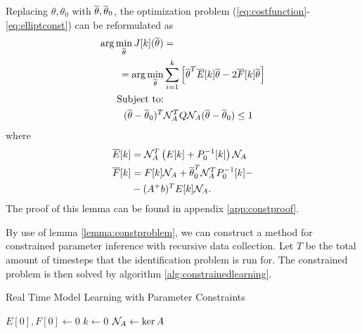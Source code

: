 \begin{lemma}
Replacing $\theta, \theta_0$ with $\overline{\theta}, \overline{\theta}_0$, the optimization problem
(\ref{eq:costfunction}-\ref{eq:elliptconst}) can be reformulated as
\begin{align}
    \arg\min\limits_{\overline{\theta}} J[k](\overline{\theta}) &= \notag
        \\ = \arg\min\limits_{\overline{\theta}} &
            \sum\limits_{i=1}^k \left[\overline{\theta}^T\overline{E}[k]\overline{\theta} - 2\overline{F}[k]\overline{\theta}\right]
            \label{eq:Jconst}\\
    \text{Subject to:}& \notag \\
    (\overline{\theta}-\overline{\theta}_0)^T&\mathcal{N}_A^TQ\mathcal{N}_A(\overline{\theta}-\overline{\theta}_0) \leq 1
    \label{eq:redelliptconst}
\end{align}
where
\begin{align}
        \overline{E}[k] &= \mathcal{N}_A^T\left(E[k] + P_0^{-1}[k]\right)\mathcal{N}_A \label{eq:Econst}\\
        \overline{F}[k] &= F[k]\mathcal{N}_A + \overline{\theta}_0^T\mathcal{N}_A^TP_0^{-1}[k] - \notag \\
        &-(A^+b)^TE[k]\mathcal{N}_A \label{eq:Fconst}.
\end{align}
The proof of this lemma can be found in appendix \ref{app:constproof}.
\label{lemma:constproblem}
\end{lemma}
By use of lemma \ref{lemma:constproblem}, we can construct a method for constrained
parameter inference with recursive data collection. Let $T$ be the total amount of timesteps
that the identification problem is run for. The constrained problem is then solved by
algorithm \ref{alg:constrainedlearning}.
\begin{algorithm}
    \caption{Real Time Model Learning with Parameter Constraints}
    \label{alg:constrainedlearning}
    $E[0], F[0] \gets 0$\;
    $k \gets 0$\;
    $\mathcal{N}_A \gets \ker A$\;
\end{algorithm}